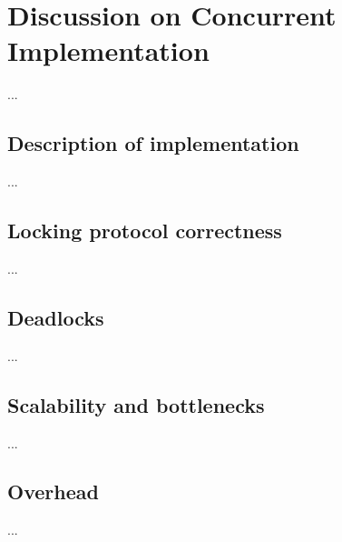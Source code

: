 
\section{Discussion on Concurrent Implementation}
...

\subsection{Description of implementation}
...

\subsection{Locking protocol correctness}
...

\subsection{Deadlocks}
...

\subsection{Scalability and bottlenecks}
...

\subsection{Overhead}
...

